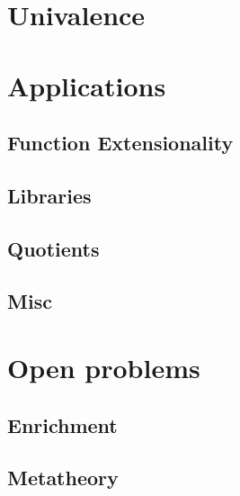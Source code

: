 \documentclass[xcolor=svgnames]{beamer}
\begin{document}
\section{Univalence}

\begin{frame}
  \begin{center}
  \end{center}
\end{frame}

\section{Applications}

\subsection{Function Extensionality}
\subsection{Libraries}
\subsection{Quotients}
\subsection{Misc}

\section{Open problems}
\subsection{Enrichment}
\subsection{Metatheory}
\end{document}
